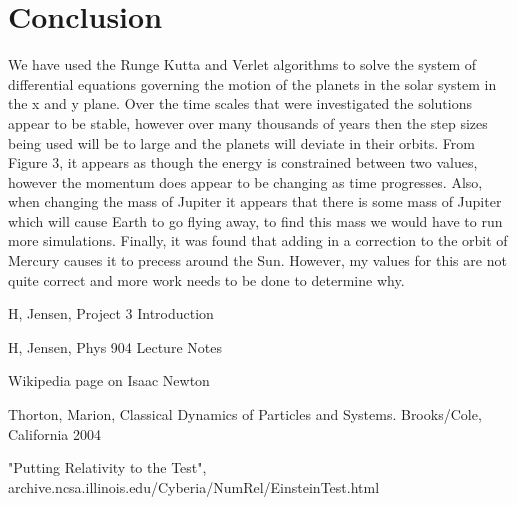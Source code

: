\documentclass[12pt,righttag]{article}
\begin{document}
	
\section{Conclusion}

We have used the Runge Kutta and Verlet algorithms to solve the system of differential equations governing the motion of the planets in the solar system in the x and y plane. Over the time scales that were investigated the solutions appear to be stable, however over many thousands of years then the step sizes being used will be to large and the planets will deviate in their orbits. From Figure 3, it appears as though the energy is constrained between two values, however the momentum does appear to be changing as time progresses. Also, when changing the mass of Jupiter it appears that there is some mass of Jupiter which will cause Earth to go flying away, to find this mass we would have to run more simulations. Finally, it was found that adding in a correction to the orbit of Mercury causes it to precess around the Sun. However, my values for this are not quite correct and more work needs to be done to determine why.

 
\begin{thebibliography}{9}
	H, Jensen, Project 3 Introduction
	
	H, Jensen, Phys 904 Lecture Notes
	
	Wikipedia page on Isaac Newton
	
Thorton, Marion, Classical Dynamics of Particles and Systems. Brooks/Cole, California 2004
	
"Putting Relativity to the Test", archive.ncsa.illinois.edu/Cyberia/NumRel/EinsteinTest.html
	
\end{thebibliography}
\end{document}
